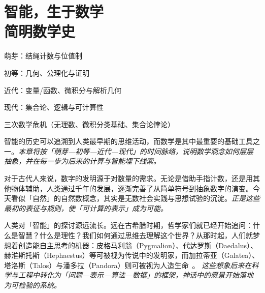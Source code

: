 \chapter{智能，生于数学 \texorpdfstring{\\}{ }简明数学史}
\newenvironment{examplebox}
{\par\vspace{0.5em}\noindent\hrulefill\par\noindent{示例盒子：三跳链}\par\small}
{\par\noindent\hrulefill\vspace{0.5em}\normalsize\par}

\begin{introduction}
\item 萌芽：结绳计数与位值制
\item 初等：几何、公理化与证明
\item 近代：变量/函数、微积分与解析几何
\item 现代：集合论、逻辑与可计算性
\item 三次数学危机（无理数、微积分类基础、集合论悖论）
\end{introduction}

智能的历史可以追溯到人类最早期的思维活动，而数学是其中最重要的基础工具之一。\emph{本章将按「萌芽—初等—近代—现代」的时间脉络，说明数学观念如何层层抽象，并在每一步为后来的计算与智能埋下线索。}

对于古代人来说，数字的发明源于对数量的需求。无论是借助手指计数，还是用其他物体辅助，人类通过千年的发展，逐渐完善了从简单符号到抽象数字的演变。今天看似「自然」的自然数概念，其实是无数社会实践与思想试验的沉淀。\emph{正是这些最初的表征与规则，使「可计算的表示」成为可能。}

人类对「智能」的探讨源远流长。远在古希腊时期，哲学家们就已经开始追问：什么是智慧？什么是理性？我们如何通过思维去理解这个世界？从那时起，人们就梦想着创造能自主思考的机器：皮格马利翁（Pygmalion）、代达罗斯（Daedalus）、赫淮斯托斯（Hephaestus）等可被视为传说中的发明家，而加拉蒂亚（Galatea）、塔洛斯（Talos）与潘多拉（Pandora）则可被视为人造生命~{\cite{OvidMartin2004,Sparkes1996,Tandy1997}}。 \emph{这些想象后来在科学与工程中转化为「问题—表示—算法—数据」的框架，神话中的愿景开始落地为可检验的系统。}

